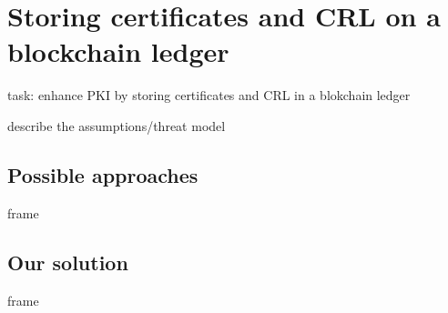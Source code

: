 \section[sec3]{Storing certificates and CRL on a blockchain ledger}

\begin{frame}
task: enhance PKI by storing certificates
and CRL
in a blokchain ledger

describe the assumptions/threat model
\end{frame}

\subsection[subsec1]{Possible approaches}

\begin{frame}
frame
\end{frame}

\subsection[subsec2]{Our solution}

\begin{frame}
frame
\end{frame}